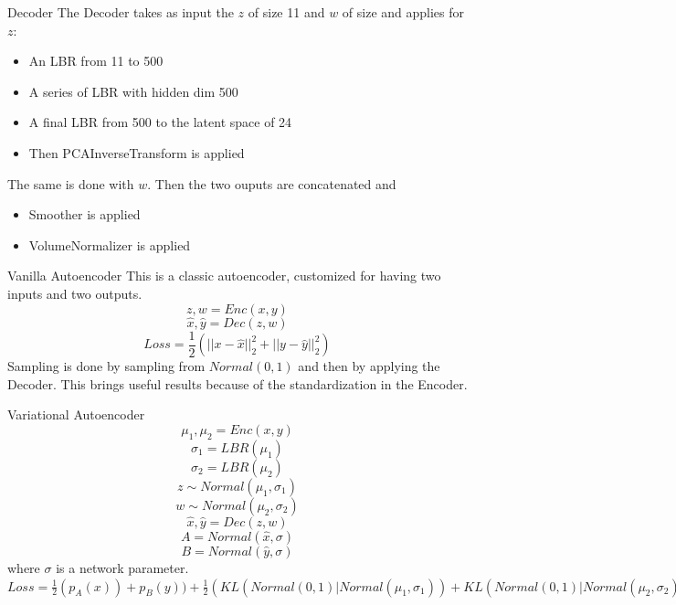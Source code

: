 \documentclass{beamer}
\begin{document}
\begin{frame}{Decoder}
The Decoder takes as input the  $z$ of size 11 and $w$ of size and applies for $z$:
\begin{itemize}
\item An  LBR from 11 to 500
\item A series of LBR with hidden dim 500
\item A final LBR from 500 to the latent space of 24
\item Then PCAInverseTransform is applied
\end{itemize}
The same is done with $w$. 
Then the two ouputs are concatenated and 
\begin{itemize}
\item Smoother is applied
\item VolumeNormalizer is applied
\end{itemize}
\end{frame}
\begin{frame}{Vanilla Autoencoder}
This is a classic autoencoder, customized for having two inputs and two outputs.
$$z,w=Enc(x,y)$$
$$\hat{x},\hat{y}=Dec(z,w)$$
$$Loss=\frac{1}{2}(||x-\hat{x}||_{2}^{2}+||y-\hat{y}||_{2}^{2})$$
Sampling is done by sampling from $Normal(0,1)$  and then by applying the Decoder. This brings useful results because of the standardization in the Encoder.
\end{frame}
\begin{frame}{Variational Autoencoder}
$$\mu_{1},\mu_{2}=Enc(x,y)$$
$$\sigma_{1}=LBR(\mu_{1})$$
$$\sigma_{2}=LBR(\mu_{2})$$
$$z\sim Normal(\mu_{1},\sigma_{1})$$
$$w\sim Normal(\mu_{2},\sigma_{2})$$
$$\hat{x},\hat{y}=Dec(z,w)$$
$$A=Normal(\hat{x},\sigma)$$
$$B=Normal(\hat{y},\sigma)$$
where $\sigma$ is a network parameter.
$Loss=\frac{1}{2}(p_{A}(x))+p_{B}(y))+\frac{1}{2}(KL(Normal(0,1)|Normal(\mu_{1},\sigma_{1}))+KL(Normal(0,1)|Normal(\mu_{2},\sigma_{2})))$
\end{frame}
\end{document}

